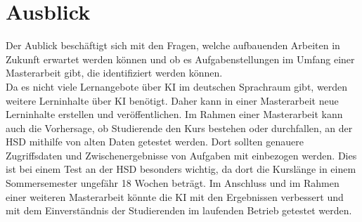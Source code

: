 \chapter{Ausblick}
Der Aublick beschäftigt sich mit den Fragen, welche aufbauenden Arbeiten in Zukunft erwartet werden können und ob es Aufgabenstellungen im Umfang einer Masterarbeit gibt, die identifiziert werden können.
\\ \noindent
Da es nicht viele Lernangebote über \ac{KI} im deutschen Sprachraum gibt, werden weitere Lerninhalte über \ac{KI} benötigt. Daher kann in einer Masterarbeit neue Lerninhalte erstellen und veröffentlichen.
Im Rahmen einer Masterarbeit kann auch die Vorhersage, ob Studierende den Kurs bestehen oder durchfallen, an der HSD mithilfe von alten Daten getestet werden.
Dort sollten genauere Zugriffsdaten und Zwischenergebnisse von Aufgaben mit einbezogen werden. Dies ist bei einem Test an der HSD besonders wichtig, da dort die Kurslänge in einem Sommersemester ungefähr 18 Wochen beträgt.
Im Anschluss und im Rahmen einer weiteren Masterarbeit könnte die KI mit den Ergebnissen verbessert und mit dem Einverständnis der Studierenden im laufenden Betrieb getestet werden.
